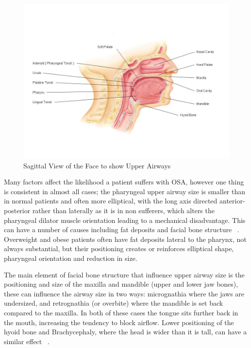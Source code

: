 \begin{figure}[h]
\centering
\includegraphics[width=1\textwidth]{drawings/Sagittal-Face}
\caption{Sagittal View of the Face to show Upper Airways ~\cite{sagittalface}}
\label{fig:Sagittal-Face}
\end{figure}
Many factors affect the likelihood a patient suffers with OSA, however one thing is consistent in almost all cases; the pharyngeal upper airway size is smaller than in normal patients and often more elliptical, with the long axis directed anterior-posterior rather than laterally as it is in non sufferers, which alters the pharyngeal dilator muscle orientation leading to a mechanical disadvantage. This can have a number of causes including fat deposits and facial bone structure ~\cite{leiter1996upper}. 
Overweight and obese patients often have fat deposits lateral to the pharynx, not always substantial, but their positioning creates or reinforces elliptical shape, pharyngeal orientation and reduction in size. 

The main element of facial bone structure that influence upper airway size is the positioning and size of the maxilla and mandible (upper and lower jaw bones), these can influence the airway size in two ways: micrognathia where the jaws are undersized, and retrognathia (or overbite) where the mandible is set back compared to the maxilla. In both of these cases the tongue sits further back in the mouth, increasing the tendency to block airflow. Lower positioning of the hyoid bone and Brachycephaly, where the head is wider than it is tall, can have a similar effect ~\cite{lowe1995cephalometric}.


